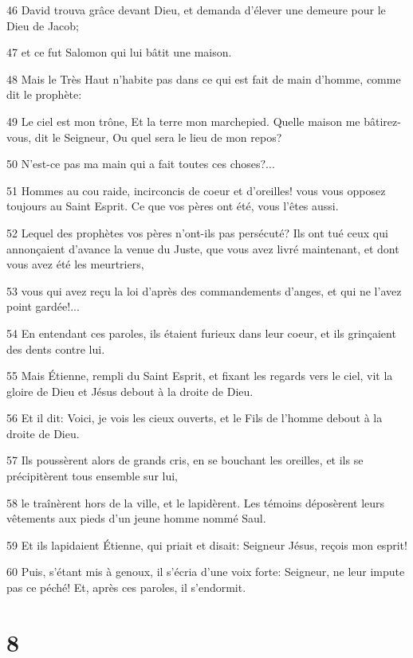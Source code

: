 \par 46 David trouva grâce devant Dieu, et demanda d'élever une demeure pour le Dieu de Jacob;
\par 47 et ce fut Salomon qui lui bâtit une maison.
\par 48 Mais le Très Haut n'habite pas dans ce qui est fait de main d'homme, comme dit le prophète:
\par 49 Le ciel est mon trône, Et la terre mon marchepied. Quelle maison me bâtirez-vous, dit le Seigneur, Ou quel sera le lieu de mon repos?
\par 50 N'est-ce pas ma main qui a fait toutes ces choses?...
\par 51 Hommes au cou raide, incirconcis de coeur et d'oreilles! vous vous opposez toujours au Saint Esprit. Ce que vos pères ont été, vous l'êtes aussi.
\par 52 Lequel des prophètes vos pères n'ont-ils pas persécuté? Ils ont tué ceux qui annonçaient d'avance la venue du Juste, que vous avez livré maintenant, et dont vous avez été les meurtriers,
\par 53 vous qui avez reçu la loi d'après des commandements d'anges, et qui ne l'avez point gardée!...
\par 54 En entendant ces paroles, ils étaient furieux dans leur coeur, et ils grinçaient des dents contre lui.
\par 55 Mais Étienne, rempli du Saint Esprit, et fixant les regards vers le ciel, vit la gloire de Dieu et Jésus debout à la droite de Dieu.
\par 56 Et il dit: Voici, je vois les cieux ouverts, et le Fils de l'homme debout à la droite de Dieu.
\par 57 Ils poussèrent alors de grands cris, en se bouchant les oreilles, et ils se précipitèrent tous ensemble sur lui,
\par 58 le traînèrent hors de la ville, et le lapidèrent. Les témoins déposèrent leurs vêtements aux pieds d'un jeune homme nommé Saul.
\par 59 Et ils lapidaient Étienne, qui priait et disait: Seigneur Jésus, reçois mon esprit!
\par 60 Puis, s'étant mis à genoux, il s'écria d'une voix forte: Seigneur, ne leur impute pas ce péché! Et, après ces paroles, il s'endormit.

\chapter{8}

